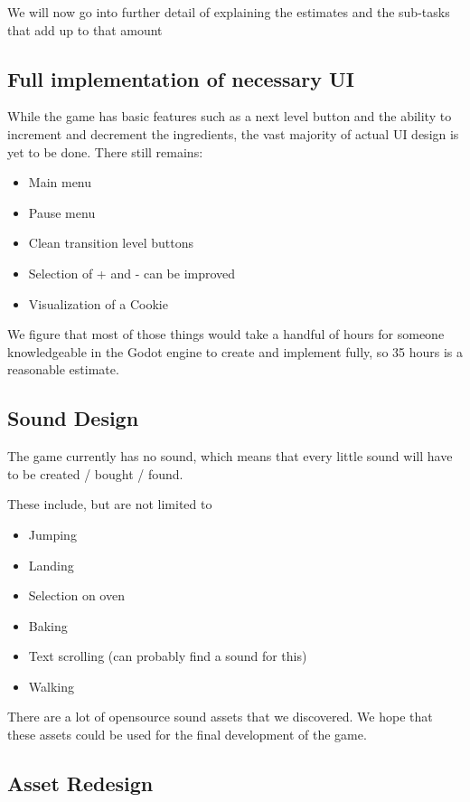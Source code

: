 \documentclass{article}
\begin{document}
We will now go into further detail of explaining the estimates and the
sub-tasks that add up to that amount

\subsection{Full implementation of necessary UI}

While the game has basic features such as a next level button and the
ability to increment and decrement the ingredients, the vast majority
of actual UI design is yet to be done. There still remains:

\begin{itemize}
  \item Main menu
  \item Pause menu
  \item Clean transition level buttons
  \item Selection of + and - can be improved
  \item Visualization of a Cookie
\end{itemize}

We figure that most of those things would take a handful of hours for
someone knowledgeable in the Godot engine to create and implement fully, 
so 35 hours is a reasonable estimate.

\subsection{Sound Design}

The game currently has no sound, which means that every little sound
will have to be created / bought / found.

These include, but are not limited to

\begin{itemize}
  \item Jumping
  \item Landing
  \item Selection on oven
  \item Baking
  \item Text scrolling (can probably find a sound for this)
  \item Walking
\end{itemize}

There are a lot of opensource sound assets that we discovered. We hope
that these assets could be used for the final development of the game.

\subsection{Asset Redesign}
\end{document}
